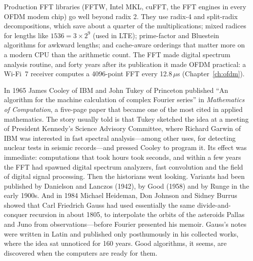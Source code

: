 Production FFT libraries (FFTW, Intel MKL, cuFFT, the FFT engines in every OFDM modem chip) go well
beyond radix 2. They use radix-4 and split-radix decompositions, which save about a quarter of the
multiplications; mixed radices for lengths like $1536=3\times2^9$ (used in LTE); prime-factor and
Bluestein algorithms for awkward lengths; and cache-aware orderings that matter more on a modern CPU
than the arithmetic count. The FFT made digital spectrum analysis routine, and forty years after its
publication it made OFDM practical: a Wi-Fi~7 receiver computes a 4096-point FFT every
12.8\,$\mu$s (Chapter~\ref{ch:ofdm}).

\begin{history}
In 1965 James Cooley of IBM and John Tukey of Princeton published ``An algorithm for the machine
calculation of complex Fourier series'' in \emph{Mathematics of Computation}, a five-page paper that
became one of the most cited in applied mathematics. The story usually told is that Tukey sketched
the idea at a meeting of President Kennedy's Science Advisory Committee, where Richard Garwin of IBM
was interested in fast spectral analysis---among other uses, for detecting nuclear tests in seismic
records---and pressed Cooley to program it. Its effect was immediate: computations that took hours took
seconds, and within a few years the FFT had spawned digital spectrum analyzers, fast convolution and
the field of digital signal processing. Then the historians went looking. Variants had been published
by Danielson and Lanczos (1942), by Good (1958) and by Runge in the early 1900s. And in 1984 Michael
Heideman, Don Johnson and Sidney Burrus showed that Carl Friedrich Gauss had used essentially the same
divide-and-conquer recursion in about 1805, to interpolate the orbits of the asteroids Pallas and
Juno from observations---before Fourier presented his memoir. Gauss's notes were written in Latin and
published only posthumously in his collected works, where the idea sat unnoticed for 160 years.
Good algorithms, it seems, are discovered when the computers are ready for them.
\end{history}


